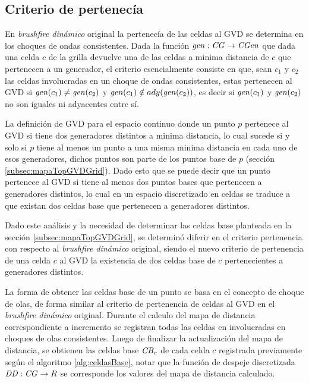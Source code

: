 \subsection{Criterio de pertenecía}\label{subsec:critPer}

En \emph{brushfire dinámico} original la pertenecía de las celdas al GVD se
determina en los choques de ondas consistentes. Dada la función $\mathit{gen} :
\mathit{CG} \rightarrow \mathit{CGen}$ que dada una celda $c$ de la grilla devuelve
una de las celdas a minima distancia de $c$ que pertenecen a un generador, el
criterio esencialmente consiste en que, sean $c_1$ y $c_2$ las celdas
involucradas en un choque de ondas consistentes, estas pertenecen al GVD si
$\mathit{gen}(c_1) \neq \mathit{gen}(c_2)$ y $\mathit{gen}(c_1) \notin
ady(\mathit{gen}(c_2))$, es decir si $\mathit{gen}(c_1)$ y $\mathit{gen}(c_2)$ no son
iguales ni adyacentes entre sí. 

La definición de GVD para el espacio continuo donde un punto $p$ pertenece al
GVD si tiene dos generadores distintos a minima distancia, lo cual sucede si y solo si
$p$ tiene al menos un punto a una misma minima distancia en cada uno de esos generadores,
dichos puntos son parte de los puntos base de $p$ (sección
\ref{subsec:mapaTopGVDGrid}). Dado esto que se puede decir que un punto pertenece
al GVD si tiene al menos dos puntos bases que pertenecen a generadores
distintos, lo cual en un espacio discretizado en celdas se traduce a que
existan dos celdas base que pertenecen a generadores distintos.

Dado este análisis y la necesidad de determinar las celdas base planteada en la
sección \ref{subsec:mapaTopGVDGrid}, se determinó diferir en el criterio
pertenencia con respecto al \emph{brushfire dinámico} original, siendo el nuevo
criterio de pertenencia de una celda $c$ al GVD la existencia de dos celdas
base de $c$ pertenecientes a generadores distintos.

La forma de obtener las celdas base de un punto se basa en el concepto de
choque de olas, de forma similar al criterio de pertenencia de celdas al GVD en
el \emph{brushfire dinámico} original. Durante el calculo del mapa de distancia
correspondiente a incremento se registran todas las celdas en involucradas en
choques de olas consistentes. Luego de finalizar la actualización del mapa de
distancia, se obtienen las celdas base $\mathit{CB}_c$ de cada celda $c$
registrada previamente según el algoritmo \ref{alg:celdasBase}, notar que la
función de despeje discretizada $\mathit{DD} : \mathit{CG} \rightarrow R$ se
corresponde los valores del mapa de distancia calculado.

